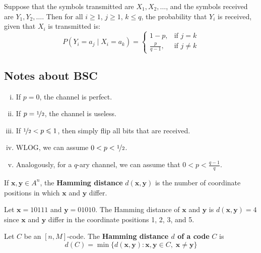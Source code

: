 Suppose that the symbols transmitted are $ X_1,X_2,\ldots $,
and the symbols received are $ Y_1,Y_2,\ldots $. Then for all
$ i\geqslant 1 $, $ j\geqslant 1 $, $ k\leqslant q $, the probability
that $ Y_i $ is received, given that $ X_i $ is transmitted is:
\[ P(Y_i=a_j\mid X_i=a_k)=
\begin{cases}
    1-p, & \text{if } j=k\\
    \frac{p}{q-1}, & \text{if } j\neq k
\end{cases} \]

\subsection{Notes about BSC}
\begin{enumerate}[(i)]
    \item If $ p=0 $, the channel is perfect.
    \item If $ p=\nicefrac{1}{2} $, the channel is useless.
    \item If $ \nicefrac{1}{2}<p\leqslant 1 $, then simply flip all bits that are received.
    \item WLOG, we can assume $ 0<p<\nicefrac{1}{2} $.
    \item Analogously, for a $ q $-ary channel, we can assume that $ 0<p<\frac{q-1}{q} $.
\end{enumerate}

\begin{defbox}
    \begin{definition}
    If $ \bm{x},\bm{y}\in A^n $, the \textbf{Hamming distance} $ d(\bm{x},\bm{y}) $ is
    the number of coordinate positions in which $ \bm{x} $ and $ \bm{y} $ differ.
\end{definition} \end{defbox}

\begin{exbox}
    \begin{example}
        Let $ \bm{x} = 10111 $ and $ \bm{y} = 01010 $. The Hamming distance
        of $ \bm{x} $ and $ \bm{y} $ is $  d(\bm{x},\bm{y})=4  $
        since $ \bm{x} $ and $ \bm{y} $ differ in the coordinate positions
        1, 2, 3, and 5.
    \end{example}
\end{exbox}

\begin{defbox}
    \begin{definition}
    Let $ C $ be an $ [n,M] $-code.
    The \textbf{Hamming distance $ d $ of a code} $ C $ is
    \[ d(C)=\min \{d(\bm{x},\bm{y}):\bm{x},\bm{y}\in C,\;\bm{x}\neq \bm{y}\} \]
\end{definition} \end{defbox}


